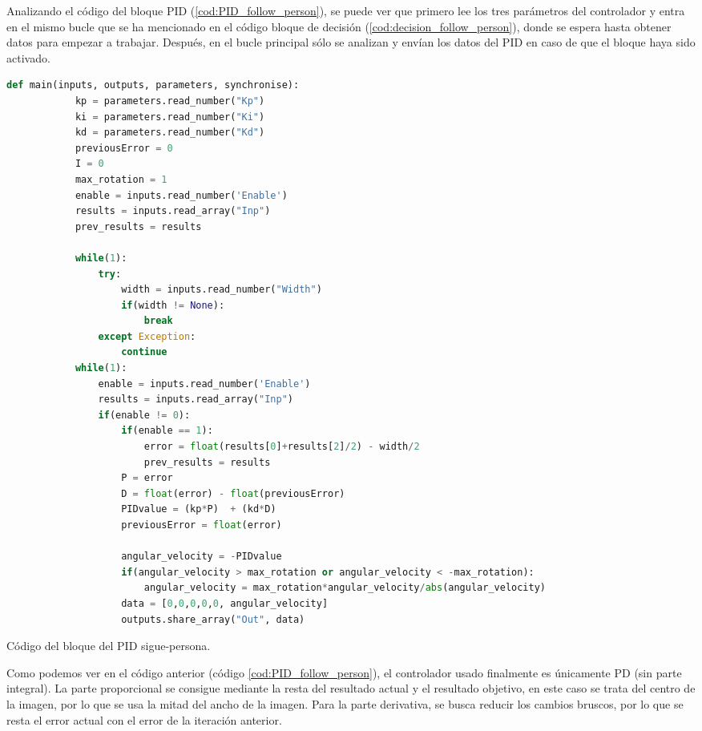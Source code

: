 Analizando el código del bloque PID (\ref{cod:PID_follow_person}), se puede ver que primero lee los tres parámetros del controlador y entra en el
mismo bucle que se ha mencionado en el código bloque de decisión (\ref{cod:decision_follow_person}), donde se espera hasta obtener datos para
empezar a trabajar. Después, en el bucle principal sólo se analizan y envían los datos del PID en caso de que el bloque haya sido activado.\\

\begin{code}[H]
    \begin{lstlisting}[language=python]
        def main(inputs, outputs, parameters, synchronise):
            kp = parameters.read_number("Kp")
            ki = parameters.read_number("Ki")
            kd = parameters.read_number("Kd")
            previousError = 0
            I = 0
            max_rotation = 1
            enable = inputs.read_number('Enable')
            results = inputs.read_array("Inp")
            prev_results = results

            while(1):
                try:
                    width = inputs.read_number("Width")
                    if(width != None):
                        break
                except Exception:
                    continue
            while(1):
                enable = inputs.read_number('Enable')
                results = inputs.read_array("Inp")
                if(enable != 0):
                    if(enable == 1):
                        error = float(results[0]+results[2]/2) - width/2
                        prev_results = results
                    P = error
                    D = float(error) - float(previousError)
                    PIDvalue = (kp*P)  + (kd*D)
                    previousError = float(error)

                    angular_velocity = -PIDvalue
                    if(angular_velocity > max_rotation or angular_velocity < -max_rotation):
                        angular_velocity = max_rotation*angular_velocity/abs(angular_velocity)
                    data = [0,0,0,0,0, angular_velocity]
                    outputs.share_array("Out", data)
    \end{lstlisting}
    \caption[Código bloque PID sigue-persona]{Código del bloque del PID sigue-persona.}
    \label{cod:PID_follow_person}
\end{code}

\newpage

Como podemos ver en el código anterior (código \ref{cod:PID_follow_person}), el controlador usado finalmente es únicamente PD (sin parte integral).
La parte proporcional se consigue mediante la resta del resultado actual y el resultado objetivo, en este caso se trata del centro de la imagen,
por lo que se usa la mitad del ancho de la imagen.
Para la parte derivativa, se busca reducir los cambios bruscos, por lo que se resta el error actual con el error de la iteración anterior.\\

